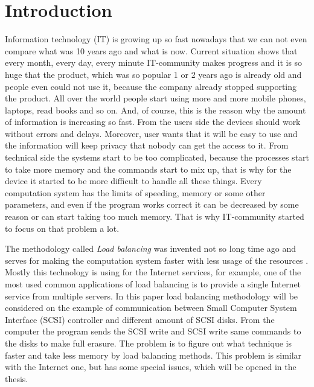 \chapter{Introduction}
\label{chap1:title}

Information technology (IT) is growing up so fast nowadays that we can not even compare what was 10 years ago and what is now. Current situation shows that every month, every day, every minute IT-community makes progress and it is so huge that the product, which was so popular 1 or 2 years ago is already old and people even could not use it, because the company already stopped supporting the product. All over the world people start using more and more mobile phones, laptops, read books and so on. And, of course, this is the reason why the amount of information is increasing so fast. From the users side the devices should work without errors and delays. Moreover, user wants that it will be easy to use and the information will keep privacy that nobody can get the access to it. From technical side the systems start to be too complicated, because the processes start to take more memory and the commands start to mix up, that is why for the device it started to be more difficult to handle all these things. Every computation system has the limits of speeding, memory or some other parameters, and even if the program works correct it can be decreased by some reason or can start taking too much memory. That is why IT-community started to focus on that problem a lot. 


The methodology called \emph{Load balancing} was invented not so long time ago and serves for making the computation system faster with less usage of the resources \cite{load_bal}. Mostly this technology is using for the Internet services, for example, one of the most used common applications of load balancing is to provide a single Internet service from multiple servers. In this paper load balancing methodology will be considered on the example of communication between Small Computer System Interface (SCSI) controller and different amount of SCSI disks. From the computer the program sends the SCSI write and SCSI write same commands to the disks to make full erasure. The problem is to figure out what technique is faster and take less memory by load balancing methods. This problem is similar with the Internet one, but has some special issues, which will be opened in the thesis.


